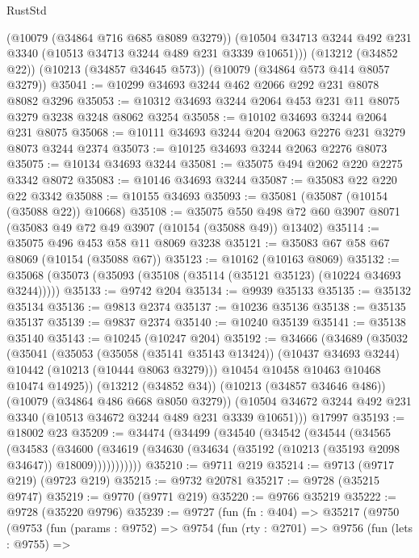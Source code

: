 \begin{lexlean}{RustStd}
\begin{coremodule}
{\begin{coremodule}
{{{{{{{{{{{{{{{{{{{{{{{{{{      (@10079 (@34864 @716 @685 @8089 @3279))
      (@10504 @34713 @3244 @492 @231 @3340 (@10513 @34713 @3244 @489 @231 @3339 @10651)))
    (@13212 (@34852 @22))
    (@10213 (@34857 @34645 @573))
    (@10079 (@34864 @573 @414 @8057 @3279))
@35041 := @10299 @34693 @3244 @462 @2066 @292 @231 @8078 @8082 @3296
@35053 := @10312 @34693 @3244 @2064 @453 @231 @11 @8075 @3279 @3238 @3248 @8062 @3254
@35058 := @10102 @34693 @3244 @2064 @231 @8075
@35068 := @10111 @34693 @3244 @204 @2063 @2276 @231 @3279 @8073 @3244 @2374
@35073 := @10125 @34693 @3244 @2063 @2276 @8073
@35075 := @10134 @34693 @3244
@35081 := @35075 @494 @2062 @220 @2275 @3342 @8072
@35083 := @10146 @34693 @3244
@35087 := @35083 @22 @220 @22 @3342
@35088 := @10155 @34693
@35093 := @35081 (@35087 (@10154 (@35088 @22)) @10668)
@35108 := @35075
    @550
    @498
    @72
    @60
    @3907
    @8071
    (@35083 @49 @72 @49 @3907 (@10154 (@35088 @49)) @13402)
@35114 := @35075 @496 @453 @58 @11 @8069 @3238
@35121 := @35083 @67 @58 @67 @8069 (@10154 (@35088 @67))
@35123 := @10162 (@10163 @8069)
@35132 := @35068 (@35073 (@35093 (@35108 (@35114 (@35121 @35123) (@10224 @34693 @3244)))))
@35133 := @9742 @204
@35134 := @9939 @35133
@35135 := @35132 @35134
@35136 := @9813 @2374
@35137 := @10236 @35136
@35138 := @35135 @35137
@35139 := @9837 @2374
@35140 := @10240 @35139
@35141 := @35138 @35140
@35143 := @10245 (@10247 @204)
@35192 := @34666
    (@34689
      (@35032
        (@35041
          (@35053
            (@35058 (@35141 @35143 @13424))
            (@10437 @34693 @3244)
            @10442
            (@10213 (@10444 @8063 @3279)))
          @10454
          @10458
          @10463
          @10468
          @10474
          @14925))
      (@13212 (@34852 @34))
      (@10213 (@34857 @34646 @486))
      (@10079 (@34864 @486 @668 @8050 @3279))
      (@10504 @34672 @3244 @492 @231 @3340 (@10513 @34672 @3244 @489 @231 @3339 @10651)))
    @17997
@35193 := @18002 @23
@35209 := @34474
    (@34499
      (@34540
        (@34542
          (@34544
            (@34565
              (@34583
                (@34600
                  (@34619 (@34630 (@34634 (@35192 (@10213 (@35193 @2098 @34647)) @18009)))))))))))
@35210 := @9711 @219
@35214 := @9713 (@9717 @219) (@9723 @219)
@35215 := @9732 @20781
@35217 := @9728 (@35215 @9747)
@35219 := @9770 (@9771 @219)
@35220 := @9766 @35219
@35222 := @9728 (@35220 @9796)
@35239 := @9727
    (fun (fn : @404) =>
    @35217
      (@9750
        (@9753
          (fun (params : @9752) =>
          @9754
            (fun (rty : @2701) =>
            @9756
              (fun (lets : @9755) =>
}}}}}}}}}}}}}}}}}}}}}}}}}}
\end{coremodule}}
\end{coremodule}
\end{lexlean}
